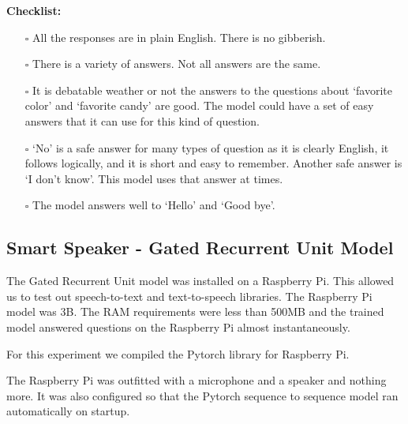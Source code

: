  
\noindent \textbf{Checklist:} 


\begin{itemize}

\item[\rlap{\raisebox{0.3ex}{\hspace{0.4ex}\scriptsize \ding{52}}}$\square$] All the responses are in plain English. There is no gibberish.

\item[\rlap{\raisebox{0.3ex}{\hspace{0.4ex}\scriptsize \ding{52}}}$\square$] There is a variety of answers. Not all answers are the same.

\item[$\square$] It is debatable weather or not the answers to the questions about `favorite color' and `favorite candy' are good. The model could have a set of easy answers that it can use for this kind of question. 

\item[\rlap{\raisebox{0.3ex}{\hspace{0.4ex}\scriptsize \ding{56}}}$\square$] `No' is a safe answer for many types of question as it is clearly English, it follows logically, and it is short and easy to remember. Another safe answer is `I don't know'. This model uses that answer at times.

\item[\rlap{\raisebox{0.3ex}{\hspace{0.4ex}\scriptsize \ding{52}}}$\square$] The model answers well to `Hello' and `Good bye'.
\end{itemize}

\subsection{Smart Speaker - Gated Recurrent Unit Model}

The Gated Recurrent Unit model was installed on a Raspberry Pi. This allowed us to test out speech-to-text and text-to-speech libraries. The Raspberry Pi model was 3B. The RAM requirements were less than 500MB and the trained model answered questions on the Raspberry Pi almost instantaneously.

For this experiment we compiled the Pytorch library for Raspberry Pi.

The Raspberry Pi was outfitted with a microphone and a speaker and nothing more. It was also configured so that the Pytorch sequence to sequence model ran automatically on startup.

